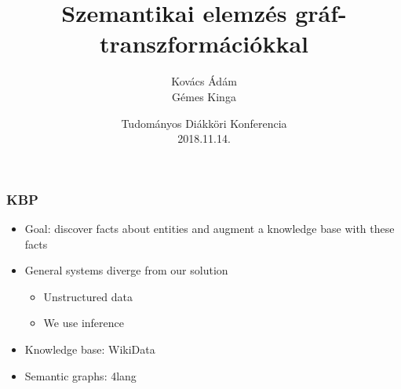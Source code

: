 \documentclass[bigger]{beamer}
\begin{document}
\title{Szemantikai elemz\'es gr\'af-transzform\'aci\'okkal}
\author{Kov\'acs \'Ad\'am \\ G\'emes Kinga}

\date{Tudományos Diákköri Konferencia\\2018.11.14.}


\begin{frame} 

\titlepage 

\end{frame} 


\begin{frame} 

    \frametitle{KBP \citep{HengJi:2011}} 
    \begin{itemize}
        \pause \item Goal: discover facts about entities and augment a knowledge base with these facts
        \pause \item General systems diverge from our solution
        \begin{itemize}
            \pause \item Unstructured data
            \pause \item We use inference
        \end{itemize}
        \pause \item Knowledge base: WikiData
        \pause \item Semantic graphs: 4lang
    \end{itemize}

\end{frame} 

\end{document}
